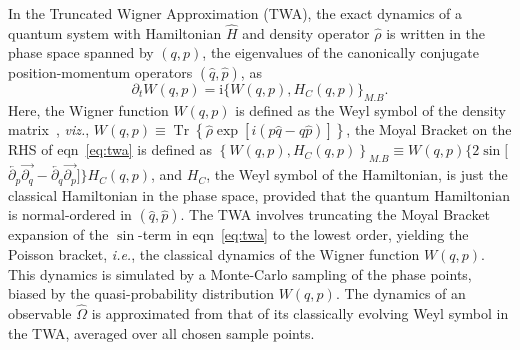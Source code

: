 \documentclass[extendedabs]{bmvc2k}
\newcommand\ii{{\mathrm{i}}}
\DeclareMathOperator{\Tr}{{Tr}}
\begin{document}
In the Truncated Wigner Approximation (TWA), the exact dynamics of a quantum system with Hamiltonian $\hat{H}$ and density operator $\hat{\rho}$ is written in the phase space spanned by $(q,p)$, the eigenvalues of the canonically conjugate position-momentum operators $(\hat{q},\hat{p})$, as
\begin{equation}
\label{eq:twa}
\partial_t W(q,p) = \ii \bigg\{W(q,p),H_C(q,p)\bigg\}_{M.B}.
\end{equation}
Here, the Wigner function $W(q,p)$ is defined as the Weyl symbol of the density matrix~\cite{Polkovnikov10}, \textit{viz.}, $W(q,p) \equiv \Tr{\left\{\hat{\rho} \exp{\left[i\left(p\hat{q}-q\hat{p}\right) \right]}\right\}}$, the Moyal Bracket on the RHS of eqn~\ref{eq:twa} is defined as $\left\{W(q,p),H_C(q,p)\right\}_{M.B}\equiv W(q,p)
\{2\sin[$\\
$\overleftarrow{\partial_p}\overrightarrow{\partial_q}-\overleftarrow{\partial_q}\overrightarrow{\partial_p}]\}H_C(q,p)$, and $H_C$, the Weyl symbol of the Hamiltonian, is just the classical Hamiltonian in the phase space, provided that the quantum Hamiltonian is normal-ordered in $(\hat{q},\hat{p})$. The TWA involves truncating the Moyal Bracket expansion of the $\sin$-term in eqn~\ref{eq:twa} to the lowest order, yielding the Poisson bracket, \textit{i.e.}, the classical dynamics of the Wigner function $W(q,p)$. This dynamics is simulated by a Monte-Carlo sampling of the phase points, biased by the quasi-probability distribution $W(q,p)$. The dynamics of an observable $\hat{\Omega}$ is approximated from that of its classically evolving Weyl symbol in the TWA, averaged over all chosen sample points.
\end{document}
